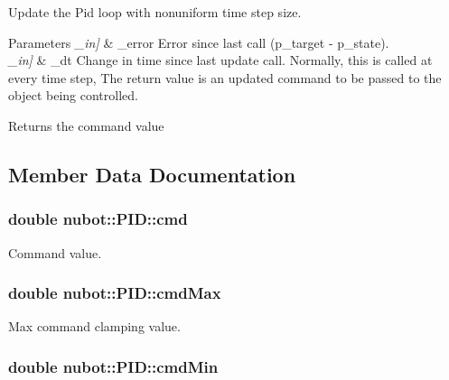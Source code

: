 Update the Pid loop with nonuniform time step size. 


\begin{DoxyParams}{Parameters}
{\em \-\_\-in\mbox{]}} & \-\_\-error Error since last call (p\-\_\-target -\/ p\-\_\-state). \\
\hline
{\em \-\_\-in\mbox{]}} & \-\_\-dt Change in time since last update call. Normally, this is called at every time step, The return value is an updated command to be passed to the object being controlled. \\
\hline
\end{DoxyParams}
\begin{DoxyReturn}{Returns}
the command value 
\end{DoxyReturn}


\subsection{Member Data Documentation}
\hypertarget{classnubot_1_1PID_a756c5fabaf2421e05302b93e9ef248a7}{
\subsubsection[{cmd}]{\setlength{\rightskip}{0pt plus 5cm}double nubot\-::\-P\-I\-D\-::cmd\hspace{0.3cm}{\ttfamily [private]}}}\label{classnubot_1_1PID_a756c5fabaf2421e05302b93e9ef248a7}


Command value. 

\hypertarget{classnubot_1_1PID_a2a4e5aac90ab72833c48b1f7f06313a6}{
\subsubsection[{cmd\-Max}]{\setlength{\rightskip}{0pt plus 5cm}double nubot\-::\-P\-I\-D\-::cmd\-Max\hspace{0.3cm}{\ttfamily [private]}}}\label{classnubot_1_1PID_a2a4e5aac90ab72833c48b1f7f06313a6}


Max command clamping value. 

\hypertarget{classnubot_1_1PID_a887cadc64650fbd326b05c081141603f}{
\subsubsection[{cmd\-Min}]{\setlength{\rightskip}{0pt plus 5cm}double nubot\-::\-P\-I\-D\-::cmd\-Min\hspace{0.3cm}{\ttfamily [private]}}}\label{classnubot_1_1PID_a887cadc64650fbd326b05c081141603f}


